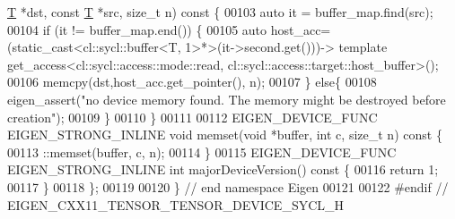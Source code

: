\begin{DoxyCode}
      \hyperlink{group___sparse_core___module_class_eigen_1_1_triplet}{T} *dst, \textcolor{keyword}{const} \hyperlink{group___sparse_core___module_class_eigen_1_1_triplet}{T} *src, \textcolor{keywordtype}{size\_t} n)\textcolor{keyword}{ const }\{
00103     \textcolor{keyword}{auto} it = buffer\_map.find(src);
00104     \textcolor{keywordflow}{if} (it != buffer\_map.end()) \{
00105       \textcolor{keyword}{auto} host\_acc= (\textcolor{keyword}{static\_cast<}cl::sycl::buffer<T, 1>*\textcolor{keyword}{>}(it->second.get()))-> \textcolor{keyword}{template} 
      get\_access<cl::sycl::access::mode::read, cl::sycl::access::target::host\_buffer>();
00106       memcpy(dst,host\_acc.get\_pointer(),  n);
00107     \} \textcolor{keywordflow}{else}\{
00108       eigen\_assert(\textcolor{stringliteral}{"no device memory found. The memory might be destroyed before creation"});
00109     \}
00110   \}
00111 
00112   EIGEN\_DEVICE\_FUNC EIGEN\_STRONG\_INLINE \textcolor{keywordtype}{void} memset(\textcolor{keywordtype}{void} *buffer, \textcolor{keywordtype}{int} c, \textcolor{keywordtype}{size\_t} n)\textcolor{keyword}{ const }\{
00113     ::memset(buffer, c, n);
00114   \}
00115   EIGEN\_DEVICE\_FUNC EIGEN\_STRONG\_INLINE \textcolor{keywordtype}{int} majorDeviceVersion()\textcolor{keyword}{ const }\{
00116   \textcolor{keywordflow}{return} 1;
00117   \}
00118 \};
00119 
00120 \}  \textcolor{comment}{// end namespace Eigen}
00121 
00122 \textcolor{preprocessor}{#endif  // EIGEN\_CXX11\_TENSOR\_TENSOR\_DEVICE\_SYCL\_H}
\end{DoxyCode}
